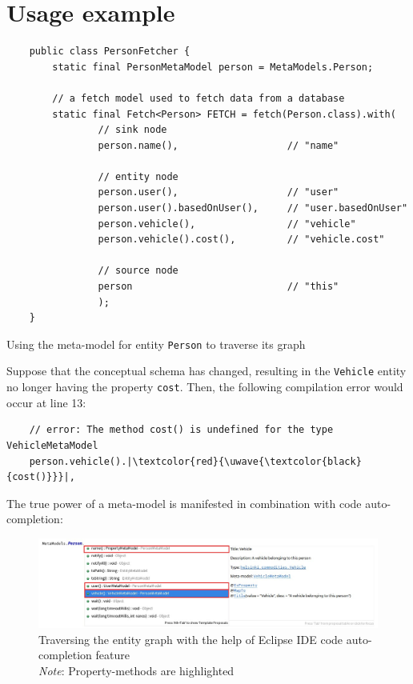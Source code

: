 \section{Usage example}
\begin{listing}[H]
    \begin{verbatim}
    public class PersonFetcher {
        static final PersonMetaModel person = MetaModels.Person;
            
        // a fetch model used to fetch data from a database
        static final Fetch<Person> FETCH = fetch(Person.class).with(
                // sink node
                person.name(),                   // "name"

                // entity node
                person.user(),                   // "user"
                person.user().basedOnUser(),     // "user.basedOnUser"
                person.vehicle(),                // "vehicle"
                person.vehicle().cost(),         // "vehicle.cost"

                // source node
                person                           // "this"
                );
    }
    \end{verbatim}
    \caption{Using the meta-model for entity \texttt{Person} to traverse its graph}
    \label{lst:person_meta-model_usage}
\end{listing}

Suppose that the conceptual schema has changed, resulting in the \texttt{Vehicle} entity no longer having the property \texttt{cost}. Then, the following compilation error would occur at line 13:
\begin{verbatim}
    // error: The method cost() is undefined for the type VehicleMetaModel
    person.vehicle().|\textcolor{red}{\uwave{\textcolor{black}{cost()}}}|,
\end{verbatim}

\n

The true power of a meta-model is manifested in combination with code auto-completion:

\begin{figure}[H]\centering
    \includegraphics[scale=0.5]{images/eclipse-hl.jpg}
    \caption[Traversing the entity graph with the help of Eclipse IDE code auto-completion feature]{Traversing the entity graph with the help of Eclipse IDE code auto-completion feature
    \\
    \textit{Note}: Property-methods are highlighted}\label{fig:meta-model_uml}
\end{figure}


